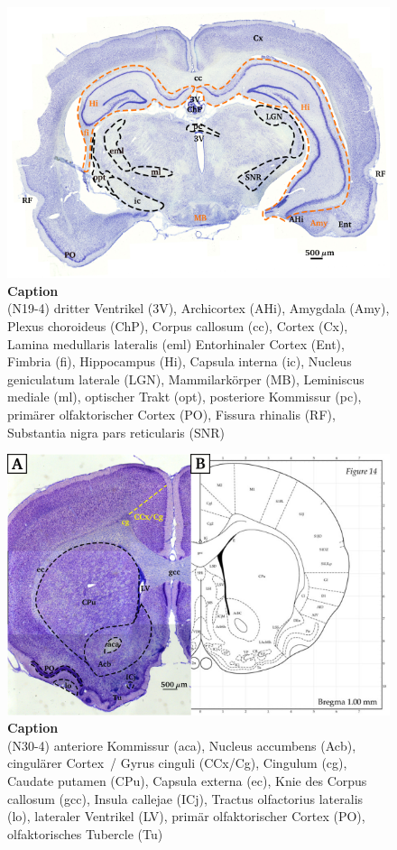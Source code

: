 \documentclass[12pt,a4paper,pdftex]{article}
\begin{document}
\begin{figure}[H]
    \centering
    \includegraphics{pictures/Basalganglia/Hippo_uebersicht.png}
    \caption[Caption]{\textbf{Caption}\\
    (N19-4)
    dritter Ventrikel (3V), Archicortex (AHi), Amygdala (Amy), Plexus choroideus (ChP), Corpus callosum (cc), Cortex (Cx), Lamina medullaris lateralis (eml) Entorhinaler Cortex (Ent), Fimbria (fi), Hippocampus (Hi), Capsula interna (ic), Nucleus geniculatum laterale (LGN), Mammilarkörper (MB), Leminiscus mediale (ml), optischer Trakt (opt), posteriore Kommissur (pc), primärer  olfaktorischer  Cortex (PO), Fissura rhinalis (RF), Substantia nigra pars reticularis (SNR)}
    \label{fig:hippo_uebersicht}
\end{figure}

\begin{figure}
    \centering
    \includegraphics{pictures/Basalganglia/cingulaerer_Cortex.png}
    \caption[Caption]{\textbf{Caption}\\
    (N30-4)
    anteriore Kommissur (aca), Nucleus accumbens (Acb), cingulärer Cortex~/ Gyrus cinguli (CCx/Cg), Cingulum (cg), Caudate putamen (CPu), Capsula externa (ec), Knie des Corpus callosum (gcc), Insula callejae (ICj), Tractus olfactorius lateralis (lo), lateraler Ventrikel (LV), primär olfaktorischer Cortex (PO), olfaktorisches Tubercle (Tu)}
    \label{fig:cingulaerer_Cortex}
\end{figure}
\end{document}
